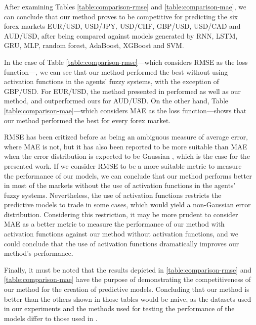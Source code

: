 \documentclass{ieeeaccess}
\begin{document}
After examining Tables \ref{table:comparison-rmse} and
\ref{table:comparison-mae}, we can conclude that our method proves to
be competitive for predicting the six forex markets EUR/USD, USD/JPY,
USD/CHF, GBP/USD, USD/CAD and AUD/USD, after being compared against
models generated by RNN, LSTM, GRU, MLP, random forest, AdaBoost,
XGBoost and SVM.

In the case of Table \ref{table:comparison-rmse}---which
considers RMSE as the loss function---, we can see that our method
performed the best without using activation functions in the agents'
fuzzy systems, with the exception of GBP/USD. For EUR/USD, the method
presented in \cite{Munkhdalai2019} performed as well as our method,
and outperformed ours for AUD/USD. On the other hand, Table
\ref{table:comparison-mae}---which considers MAE as the loss
function---shows that our method performed the best for every forex
market.

RMSE has been critized before \cite{willmott2005advantages}
\cite{willmott2009ambiguities} as being an ambiguous measure of
average error, where MAE is not, but it has also been reported to be
more suitable than MAE when the error distribution is expected to be
Gaussian \cite{chai2014root}, which is the case for the presented
work. If we consider RMSE to be a more suitable metric to measure the
performance of our models, we can conclude that our method performs
better in most of the markets without the use of activation functions
in the agents' fuzzy systems. Nevertheless, the use of activation
functions restricts the predictive models to trade in some cases,
which would yield a non-Gaussian error distribution. Considering this
restriction, it may be more prudent to consider MAE as a better metric
to measure the performance of our method with activation functions
against our method without activation functions, and we could conclude
that the use of activation functions dramatically improves our
method's performance.


Finally, it must be noted that the results depicted in
\ref{table:comparison-rmse} and \ref{table:comparison-mae} have the
purpose of demonstrating the competitiveness of our method for the
creation of predictive models. Concluding that our method is better
than the others shown in those tables would be naive, as the datasets
used in our experiments and the methods used for testing the
performance of the models differ to those used in
\cite{Munkhdalai2019}.
\end{document}
